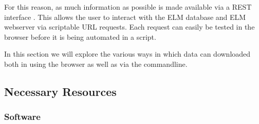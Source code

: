 \documentclass[12pt]{article}
\begin{document}
For this reason, as much information as possible is made available via a
REST interface \cite{Fielding2002}. This allows the user to interact
with the ELM database and ELM webserver via scriptable URL requests.
Each request can easily be tested in the browser before it is being
automated in a script.

In this section we will explore the various ways in which data can
downloaded both in using the browser as well as via the commandline.

%
%
\subsection*{Necessary Resources}
\subsubsection*{Software}

\end{document}
